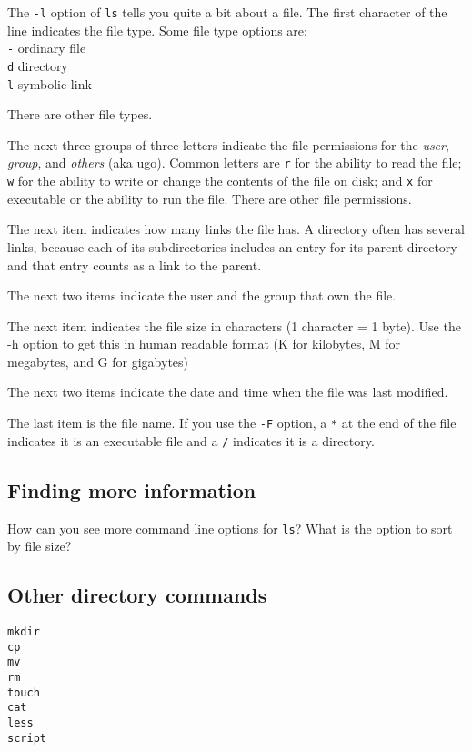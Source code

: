 \documentclass[12pt]{article}
\begin{document}
The \texttt{-l} option of \texttt{ls} tells you quite a bit about a file. The first character of the line indicates the file type. Some file type options are:
\\\texttt{-} ordinary file
\\\texttt{d} directory
\\\texttt{l} symbolic link

There are other file types.

The next three groups of three letters indicate the file permissions for the \emph{user}, \emph{group}, and \emph{others} (aka ugo). Common letters are \texttt{r} for the ability to read the file; \texttt{w} for the ability to write or change the contents of the file on disk; and \texttt{x} for executable or the ability to run the file. There are other file permissions.

The next item indicates how many links the file has. A directory often has several links, because each of its subdirectories includes an entry for its parent directory and that entry counts as a link to the parent.

The next two items indicate the user and the group that own the file.

The next item indicates the file size in characters (1 character = 1 byte). Use the -h option to get this in human readable format (K for kilobytes, M for megabytes, and G for gigabytes)

The next two items indicate the date and time when the file was last modified.

The last item is the file name. If you use the \texttt{-F} option, a \texttt{*} at the end of the file indicates it is an executable file and a \texttt{/} indicates it is a directory.


\subsection*{Finding more information}

How can you see more command line options for \texttt{ls}? What is the option to sort by file size?


\subsection{Other directory commands}

\begin{lstlisting}[style=bash]
mkdir 
cp
mv
rm
touch
cat
less
script
\end{lstlisting}
\end{document}
